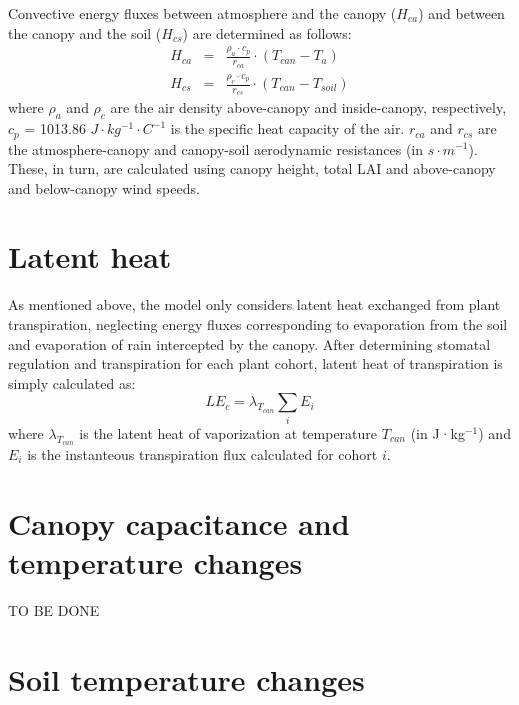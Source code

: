 \documentclass[]{book}
\begin{document}
Convective energy fluxes between atmosphere and the canopy (\(H_{ca}\)) and between the canopy and the soil (\(H_{cs}\)) are determined as follows:
\begin{eqnarray}
H_{ca} &=& \frac{\rho_{a} \cdot c_p}{r_{ca}}\cdot (T_{can} - T_a) \\
H_{cs} &=& \frac{\rho_{c} \cdot c_p}{r_{cs}}\cdot (T_{can} - T_{soil})
\end{eqnarray}
where \(\rho_{a}\) and \(\rho_{c}\) are the air density above-canopy and inside-canopy, respectively, \(c_{p}\) = 1013.86 \(J·kg^{-1}·C^{-1}\) is the specific heat capacity of the air. \(r_{ca}\) and \(r_{cs}\) are the atmosphere-canopy and canopy-soil aerodynamic resistances (in \(s·m^{-1}\)). These, in turn, are calculated using canopy height, total LAI and above-canopy and below-canopy wind speeds.

\hypertarget{latent-heat}{%
\section{Latent heat}\label{latent-heat}}

As mentioned above, the model only considers latent heat exchanged from plant transpiration, neglecting energy fluxes corresponding to evaporation from the soil and evaporation of rain intercepted by the canopy. After determining stomatal regulation and transpiration for each plant cohort, latent heat of transpiration is simply calculated as:
\begin{equation}
LE_{c} = \lambda_{T_{can}} \sum_{i}{E_i}
\end{equation}
where \(\lambda_{T_{can}}\) is the latent heat of vaporization at temperature \(T_{can}\) (in J·kg\(^{-1}\)) and \(E_i\) is the instanteous transpiration flux calculated for cohort \(i\).

\hypertarget{canopy-capacitance-and-temperature-changes}{%
\section{Canopy capacitance and temperature changes}\label{canopy-capacitance-and-temperature-changes}}

TO BE DONE

\hypertarget{soil-temperature-changes}{%
\section{Soil temperature changes}\label{soil-temperature-changes}}
\end{document}
